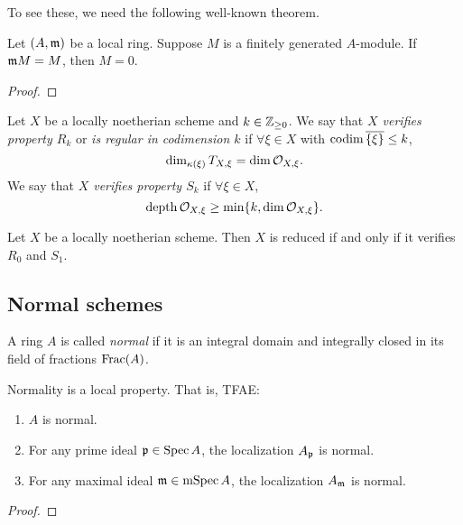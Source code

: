     To see these, we need the following well-known theorem.

    \begin{theorem}
        Let $(A,{\mathfrak{m}})$ be a local ring.
        Suppose $M$ is a finitely generated $A$-module.
        If ${\mathfrak{m}} M = M$, then $M = 0$.
    \end{theorem}
    \begin{proof}
    \end{proof}

    \begin{definition}
        Let $X$ be a locally noetherian scheme and $k \in {\mathbb{Z}}_{\geq 0}$.
        We say that \textit{$X$ verifies property $R_k$} or \textit{is regular in codimension $k$} if $\forall \xi \in X$ with $\operatorname{codim} \overline{\{\xi\}} \leq k$, 
        \[ \dim_{{\kappa}(\xi)} T_{X,\xi} = \dim {\mathcal{O}}_{X,\xi}. \]
        We say that \textit{$X$ verifies property $S_k$} if $\forall \xi \in X$,
        \[ \operatorname{depth} {\mathcal{O}}_{X,\xi} \geq \min\{k, \dim {\mathcal{O}}_{X,\xi}\}. \]        
    \end{definition}

    \begin{proposition}
        Let $X$ be a locally noetherian scheme.
        Then $X$ is reduced if and only if it verifies $R_0$ and $S_1$.
    \end{proposition}


\subsection{Normal schemes}


    \begin{definition}
        A ring $A$ is called \textit{normal} if it is an integral domain and integrally closed in its field of fractions $\operatorname{Frac}(A)$.
    \end{definition}

    \begin{proposition}
        Normality is a local property. 
        That is, TFAE:
        \begin{enumerate}[label=(\alph*)]
            \item $A$ is normal.
            \item For any prime ideal ${\mathfrak{p}} \in \operatorname{Spec} A$, the localization $A_{\mathfrak{p}}$ is normal.
            \item For any maximal ideal ${\mathfrak{m}} \in \operatorname{mSpec} A$, the localization $A_{\mathfrak{m}}$ is normal.
        \end{enumerate}
    \end{proposition}
    \begin{proof}
        
    \end{proof}

